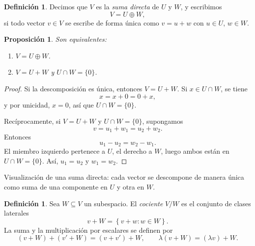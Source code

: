 \documentclass[10pt,a4paper,oneside]{article}
\theoremstyle{plain}
\newtheorem{proposition}[theorem]{Proposición}
\theoremstyle{definition}
\newtheorem{definition}[theorem]{Definición}
\theoremstyle{remark}
\newcommand{\set}[1]{\left\{ #1 \right\}}
\begin{document}
\begin{definition}
Decimos que \(V\) es la \emph{suma directa} de \(U\) y \(W\), y escribimos
\[
V=U\oplus W,
\]
si todo vector \(v\in V\) se escribe de forma única como \(v=u+w\) con \(u\in U\), \(w\in W\).
\end{definition}

\begin{proposition}
Son equivalentes:
\begin{enumerate}[label=\textup{(\roman*)}]
\item \(V=U\oplus W\).
\item \(V=U+W\) y \(U\cap W=\{0\}\).
\end{enumerate}
\end{proposition}

\begin{proof}
Si la descomposición es única, entonces \(V=U+W\). Si \(x\in U\cap W\), se tiene
\[
x=x+0=0+x,
\]
y por unicidad, \(x=0\), así que \(U\cap W=\{0\}\).

Recíprocamente, si \(V=U+W\) y \(U\cap W=\{0\}\), supongamos
\[
v=u_1+w_1=u_2+w_2.
\]
Entonces
\[
u_1-u_2=w_2-w_1.
\]
El miembro izquierdo pertenece a \(U\), el derecho a \(W\), luego ambos están en \(U\cap W=\{0\}\). Así, \(u_1=u_2\) y \(w_1=w_2\). \end{proof}

\begin{center}

{\small Visualización de una suma directa: cada vector se descompone de manera única como suma de una componente en \(U\) y otra en \(W\).}
\end{center}

\begin{definition}
Sea \(W\subseteq V\) un subespacio. El \emph{cociente} \(V/W\) es el conjunto de clases laterales
\[
v+W=\set{v+w: w\in W}.
\]
La suma y la multiplicación por escalares se definen por
\[
(v+W)+(v'+W)=(v+v')+W,
\qquad
\lambda(v+W)=(\lambda v)+W.
\]
\end{definition}
\end{document}
